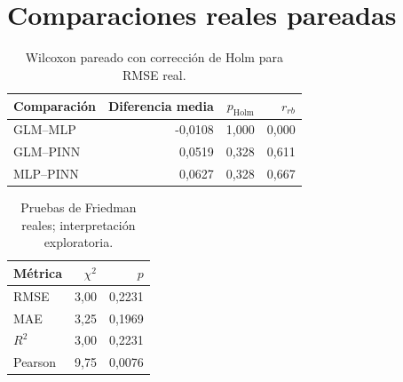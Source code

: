\section{Comparaciones reales pareadas}
\begin{table}[H]
\centering
\caption{Wilcoxon pareado con corrección de Holm para RMSE real.}
\begin{tabular}{lrrr}
\toprule
\textbf{Comparación} & \textbf{Diferencia media} & $p_{\mathrm{Holm}}$ & $r_{rb}$\\
\midrule
GLM--MLP & -0,0108 & 1,000 & 0,000\\
GLM--PINN & 0,0519 & 0,328 & 0,611\\
MLP--PINN & 0,0627 & 0,328 & 0,667\\
\bottomrule
\end{tabular}
\end{table}

\begin{table}[H]
\centering
\caption{Pruebas de Friedman reales; interpretación exploratoria.}
\begin{tabular}{lrr}
\toprule
\textbf{Métrica} & $\chi^2$ & $p$\\
\midrule
RMSE & 3,00 & 0,2231\\
MAE & 3,25 & 0,1969\\
$R^2$ & 3,00 & 0,2231\\
Pearson & 9,75 & 0,0076\\
\bottomrule
\end{tabular}
\end{table}
